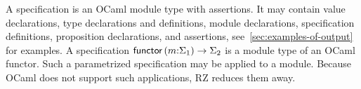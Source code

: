 A specification is an OCaml module type with assertions. It may
contain value declarations, type declarations and definitions, module
declarations, specification definitions, proposition declarations, and
assertions, see~\ref{sec:examples-of-output} for examples. A
specification $\mathsf{functor}\, (m{:}\Sigma_1) \to \Sigma_2$ is a module type of an
OCaml functor. Such a parametrized specification may be applied to a
module. Because OCaml does not support such applications, RZ reduces
them away.


